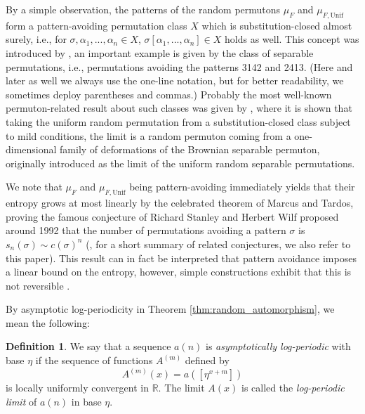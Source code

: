 \documentclass[11pt]{article}
\newcommand{\Unif}{\mathrm{Unif}}
\theoremstyle{definition}
\newtheorem{defi}[theorem]{Definition}
\begin{document}
By a simple observation, the patterns of the random permutons $\mu_{F}$ and $\mu_{F,\Unif}$ form a pattern-avoiding permutation class $X$ which is substitution-closed almost surely, i.e., for $\sigma, \alpha_1, ..., \alpha_n\in X$, $\sigma[\alpha_1, ..., \alpha_n]\in X$ holds as well. This concept was introduced by \cite{ALBERT20051}, an important example is given by the class of separable permutations, i.e., permutations avoiding the patterns 3142 and 2413. (Here and later as well we always use the one-line notation, but for better readability, we sometimes deploy parentheses and commas.) Probably the most well-known permuton-related result about such classes was given by \cite{BrownianSep}, where it is shown that taking the uniform random permutation from a substitution-closed class subject to mild conditions, the limit is a random permuton coming from a one-dimensional family of deformations of the Brownian separable permuton, originally introduced as the limit of the uniform random separable permutations. 

We note that $\mu_F$ and $\mu_{F,\Unif}$ being pattern-avoiding immediately yields that their entropy grows at most linearly by the celebrated theorem of Marcus and Tardos, proving the famous conjecture of Richard Stanley and Herbert Wilf proposed around 1992 that the number of permutations avoiding a pattern $\sigma$ is $s_n(\sigma)\sim c(\sigma)^n$ (\cite{MARCUS2004153}, for a short summary of related conjectures, we also refer to this paper). This result can in fact be interpreted that pattern avoidance imposes a linear bound on the entropy, however, simple constructions exhibit that this is not reversible \cite[Theorem~4.1]{TDK}.

By asymptotic log-periodicity in Theorem \ref{thm:random_automorphism}, we mean the following:

\begin{defi}\label{def:log_periodic}
    We say that a sequence $a(n)$ is {\it asymptotically log-periodic} with base $\eta$ if the sequence of functions $A^{(m)}$ defined by
    $$A^{(m)}(x)=a([\eta^{x+m}])$$
    is locally uniformly convergent in $\mathbb{R}$. The limit $A(x)$ is called the {\it log-periodic limit} of $a(n)$ in base $\eta$.
\end{defi}
\end{document}
